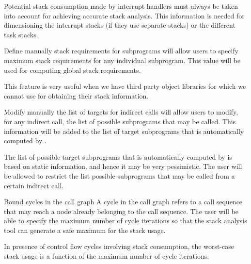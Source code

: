 \begin{rationale}
  Potential stack consumption made by interrupt handlers must always
  be taken into account for achieving accurate stack
  analysis. This information is needed for dimensioning the interrupt
  stacks (if they use separate stacks) or the different task stacks.
\end{rationale}

\begin{requirement}{Define manually stack requirements for subprograms}
  \ssat{} will allow users to specify maximum stack requirements for
  any individual subprogram. This value will be used for computing
  global stack requirements.
\end{requirement}

\begin{rationale}
  This feature is very useful when we have third party object
  libraries for which we cannot use \ssat{} for obtaining their stack
  information.
\end{rationale}

\begin{requirement}{Modify manually the list of targets for indirect calls}
  \ssat{} will allow users to modify, for any indirect call, the list of
  possible subprograms that may be called. This information will be added to
  the list of target subprograms that is automatically computed by \ssat{}. 
\end{requirement}

\begin{rationale}
  The list of possible target subprograms that is automatically
  computed by \ssat{} is based on static information, and hence it may
  be very pessimistic. The user will be allowed to restrict the list
  possible subprograms that may be called from a certain indirect
  call.
\end{rationale}

\begin{requirement}{Bound cycles in the call graph}
  A cycle in the call graph refers to a call sequence that may reach a
  node already belonging to the call sequence. The user will be able
  to specify the maximum number of cycle iterations so that the stack
  analysis tool can generate a safe maximum for the stack usage.
\end{requirement}

\begin{rationale}
  In presence of control flow cycles involving stack consumption, the
  worst-case stack usage is a function of the maximum number of cycle
  iterations.
\end{rationale}

